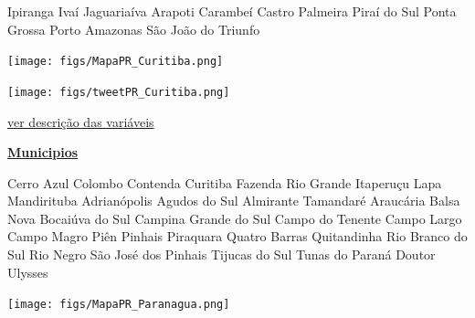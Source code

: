 \documentclass[10pt]{article} %
\begin{document}
\begin{minipage}[t]{.30\linewidth}
\begin{mdframed}[style=sidebar,frametitle={}]
\begin{itemize}
\gsquare Ipiranga 
\gsquare Ivaí 
\gsquare Jaguariaíva 
\gsquare Arapoti 
\gsquare Carambeí 
\gsquare Castro 
\gsquare Palmeira 
\gsquare Piraí do Sul 
\gsquare Ponta Grossa 
\gsquare Porto Amazonas 
\gsquare São João do Triunfo 
\end{itemize}\BackToContents\end{mdframed}\hfill\end{minipage}\newpage\begin{minipage}[t]{.66\linewidth}
\hypertarget{Crtb}{}
\texttt{[image: figs/MapaPR\_Curitiba.png]}\vspace{0.5cm}\vspace{0.5cm}\begin{center}
\texttt{[image: figs/tweetPR\_Curitiba.png]}\end{center}
\begin{center}

\end{center}
\small{\hyperlink{vartab}{ver descrição das variáveis}}\end{minipage}\hfill\begin{minipage}[t]{.30\linewidth}
\begin{mdframed}[style=sidebar,frametitle={}]
\textbf{\hyperlink{municips}{Municipios}}\begin{itemize}\gsquare Cerro Azul 
\gsquare Colombo 
\gsquare Contenda 
\gsquare Curitiba 
\gsquare Fazenda Rio Grande 
\gsquare Itaperuçu 
\gsquare Lapa 
\gsquare Mandirituba 
\gsquare Adrianópolis 
\gsquare Agudos do Sul 
\gsquare Almirante Tamandaré 
\gsquare Araucária 
\gsquare Balsa Nova 
\gsquare Bocaiúva do Sul 
\gsquare Campina Grande do Sul 
\gsquare Campo do Tenente 
\gsquare Campo Largo 
\gsquare Campo Magro 
\gsquare Piên 
\gsquare Pinhais 
\gsquare Piraquara 
\gsquare Quatro Barras 
\gsquare Quitandinha 
\gsquare Rio Branco do Sul 
\gsquare Rio Negro 
\gsquare São José dos Pinhais 
\gsquare Tijucas do Sul 
\gsquare Tunas do Paraná 
\gsquare Doutor Ulysses 
\end{itemize}\BackToContents\end{mdframed}\hfill\end{minipage}\newpage\begin{minipage}[t]{.66\linewidth}
\hypertarget{Prng}{}
\texttt{[image: figs/MapaPR\_Paranagua.png]}\vspace{0.5cm}\vspace{0.5cm}\begin{center}

\end{center}
\end{minipage}
\end{document}
